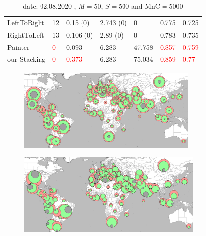 \documentclass{beamer}
\newcommand{\red}{\textcolor{red}}
\begin{document}
\begin{frame}
\begin{table}[!h]
\begin{table}[!h]
\begin{center}
{\begin{tabular}{| l || p{1.3cm} | p{1.7cm} | p{1.7cm} | p{1.5cm} | p{1.5cm} | p{1.5cm} |}
	    LeftToRight  & 12      & 0.15 (0)    & 2.743 (0)    & 0             & 0.775           & 0.725         \\

	    RightToLeft  & 13      & 0.106 (0)    & 2.89 (0)     & 0             & 0.783           & 0.735         \\
	    \hline
	    Painter      &\red 0       & 0.093        & 6.283        & 47.758        & \red{ 0.857  }         & \red{ 0.759  }       \\

	    our Stacking &\red 0       & \red{0.373}        & 6.283        & 75.034        & \red{ 0.859 }     &     \red{ 0.77 }        \\

	    \hline
	\end{tabular}}
      \end{center}
      \caption{
      date: 02.08.2020  , $M=50$, $S=500$ and $\text{MnC}=5000$ }
    \end{table}
  \end{table}
\end{frame}


\begin{frame}
  \begin{figure}[!t]
    \centering
    \includegraphics[height=4cm]{assets/MinMinAbsEval.png}
  \end{figure}
  \begin{figure}[!t]
    \centering
    \includegraphics[height=4cm]{assets/hawaiianEval.png}
  \end{figure}
\end{frame}
\end{document}
